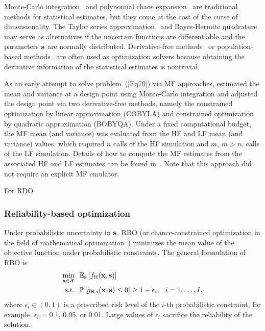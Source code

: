 \documentclass[iicol,sn-basic]{sn-jnl}%
\theoremstyle{thmstyleone}%
\theoremstyle{thmstyletwo}
\theoremstyle{thmstylethree}
\begin{document}
\begin{linenumbers}
Monte-Carlo integration~\citep{Caflisch1998} and polynomial chaos expansion~\citep{Crestaux2009} are traditional methods for statistical estimates, but they come at the cost of the curse of dimensionality.
The Taylor series approximation~\citep{Anderson2012} and Bayes-Hermite quadrature~\citep{OHagan1991} may serve as alternatives if the uncertain functions are differentiable and the parameters $\bf s$ are normally distributed.
Derivative-free methods~\citep{Larson2019} or population-based methods~\citep{Kochenderfer2019} are often used as optimization solvers because obtaining the derivative information of the statistical estimates is nontrivial.

As an early attempt to solve problem~(\ref{Eq70}) via MF approaches, \cite{Ng2014} estimated the mean and variance at a design point using Monte-Carlo integration and adjusted the design point via two derivative-free methods, namely the constrained optimization by linear approximation (COBYLA) and constrained optimization by quadratic approximation (BOBYQA).
Under a fixed computational budget, the MF mean (and variance) was evaluated from the HF and LF mean (and variance) values, which required $n$ calls of the HF simulation and $m$, $m>n$, calls of the LF simulation.
Details of how to compute the MF estimates from the associated HF and LF estimates can be found in~\cite{Ng2014}.
Note that this approach did not require an explicit MF emulator.

For RDO \cite{Shah2015,Fusi2015,Chakraborty2017,Tao2019a,Lin2022}

\subsubsection{Reliability-based optimization}\label{Sec732}

Under probabilistic uncertainty in ${\bf s}$, RBO (or chance-constrained optimization in the field of
mathematical optimization~\citep{Campi2011}) minimizes the mean value of the objective function under probabilistic constraints.
The general formulation of RBO is
\begin{equation}\label{Eq71}
	\begin{aligned}
		\underset{{\bf x} \in \mathcal{X}}{\min} \ \ & \mathbb{E}_{\bf s}\left[f_\text{H}({\bf x},{\bf s})\right]\\
		\textrm{s.t.} \ \ 
		& \mathbb{P}\left[g_{\text{H},i}({\bf x},{\bf s}) \leq 0\right] \geq 1-\epsilon_i,\ \ i=1,\dots,I, 
	\end{aligned}
\end{equation}
where $\epsilon_i \in (0,1)$ is a prescribed risk level of the $i$-th probabilistic constraint, for example, $\epsilon_i$ = 0.1, 0.05, or 0.01.
Large values of $\epsilon_i$ sacrifice the reliability of the solution.


\end{linenumbers}
\end{document}
